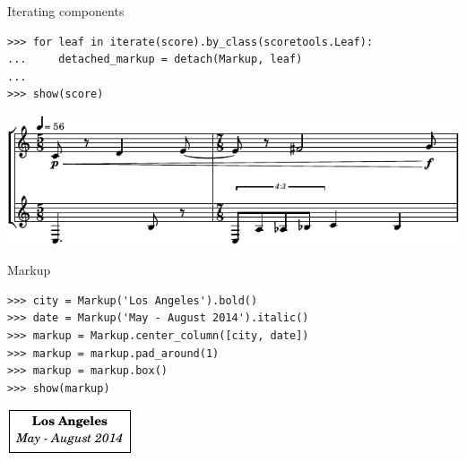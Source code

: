 \begin{frame}[fragile]{Iterating components}

\begin{abjadbookoutput}
\begin{singlespacing}
\vspace{-0.5\baselineskip}
\begin{verbatim}
>>> for leaf in iterate(score).by_class(scoretools.Leaf):
...     detached_markup = detach(Markup, leaf)
...
>>> show(score)
\end{verbatim}
\noindent\includegraphics[max width=\textwidth,]{assets/lilypond-93a2b38978bbd78fc9e299d85430127a.pdf}
\end{singlespacing}
\end{abjadbookoutput}

\end{frame}

\begin{frame}[fragile]{Markup}

\begin{abjadbookoutput}
\begin{singlespacing}
\vspace{-0.5\baselineskip}
\begin{verbatim}
>>> city = Markup('Los Angeles').bold()
>>> date = Markup('May - August 2014').italic()
>>> markup = Markup.center_column([city, date])
>>> markup = markup.pad_around(1)
>>> markup = markup.box()
>>> show(markup)
\end{verbatim}
\noindent\includegraphics[max width=\textwidth,]{assets/lilypond-8563f330fdfc46fa302925a0197dbcb5.pdf}
\end{singlespacing}
\end{abjadbookoutput}

\end{frame}

